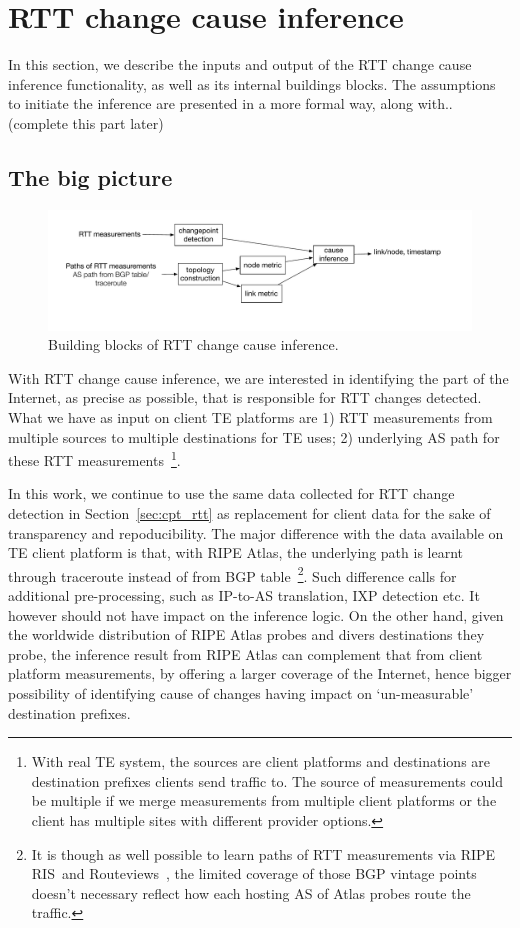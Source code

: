 \section{RTT change cause inference}
\label{sec:inference}
In this section, we describe the inputs and output of the RTT change cause inference functionality, as well as its internal buildings blocks. The assumptions to initiate the inference are presented in a more formal way, along with..(complete this part later)
\subsection{The big picture}

\begin{figure}[!htb]
\centering
\includegraphics[width=1.5\textwidth]{gfx/chap5/sys_design.pdf}
\caption{Building blocks of RTT change cause inference.}
\label{fig:chap5_sys_design}
\end{figure}

With RTT change cause inference, we are interested in identifying the part of the Internet, as precise as possible, that is responsible for RTT changes detected. What we have as input on client TE platforms are 1) RTT measurements from multiple sources to multiple destinations for TE uses; 2) underlying AS path for these RTT measurements~\footnote{With real TE system, the sources are client platforms and destinations are destination prefixes clients send traffic to. The source of measurements could be multiple if we merge measurements from multiple client platforms or the client has multiple sites with different provider options.}. 

In this work, we continue to use the same data collected for RTT change detection in Section~\ref{sec:cpt_rtt} as replacement for client data for the sake of transparency and repoducibility. The major difference with the data available on TE client platform is that, with RIPE Atlas, the underlying path is learnt through traceroute instead of from BGP table~\footnote{It is though as well possible to learn paths of RTT measurements via RIPE RIS~\cite{ris}and Routeviews~\cite{routeviews}, the limited coverage of those BGP vintage points doesn't necessary reflect how each hosting AS of Atlas probes route the traffic.}. 
Such difference calls for additional pre-processing, such as IP-to-AS translation, IXP detection etc. It however should not have impact on the inference logic. On the other hand, given the worldwide distribution of RIPE Atlas probes and divers destinations they probe, the inference result from RIPE Atlas can complement that from client platform measurements, by offering a larger coverage of the Internet, hence bigger possibility of identifying cause of changes having impact on `un-measurable' destination prefixes.

